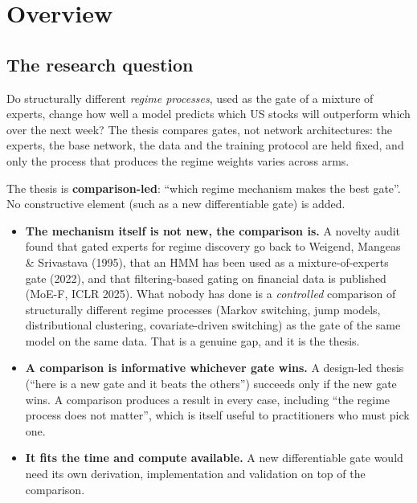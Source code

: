 \section{Overview}

\subsection{The research question}

Do structurally different \emph{regime processes}, used as the gate of a mixture of experts, change how
well a model predicts which US stocks will outperform which over the next week? The thesis compares
gates, not network architectures: the experts, the base network, the data and the training protocol
are held fixed, and only the process that produces the regime weights varies across arms.

 The thesis is \textbf{comparison-led}: ``which regime mechanism makes the best
gate''. No constructive element (such as a new differentiable gate) is added.

\begin{whybox}
\begin{itemize}
\item \textbf{The mechanism itself is not new, the comparison is.} A novelty audit found that gated experts for
  regime discovery go back to Weigend, Mangeas \& Srivastava (1995), that an HMM has been used as a
  mixture-of-experts gate (2022), and that filtering-based gating on financial data is published (MoE-F,
  ICLR 2025). What nobody has done is a \emph{controlled} comparison of structurally different regime
  processes (Markov switching, jump models, distributional clustering, covariate-driven switching) as the
  gate of the same model on the same data. That is a genuine gap, and it is the thesis.
\item \textbf{A comparison is informative whichever gate wins.} A design-led thesis (``here is a new gate and it
  beats the others'') succeeds only if the new gate wins. A comparison produces a result in every case,
  including ``the regime process does not matter'', which is itself useful to practitioners who must pick
  one.
\item \textbf{It fits the time and compute available.} A new differentiable gate would need its own
  derivation, implementation and validation on top of the comparison.
\end{itemize}
\end{whybox}

